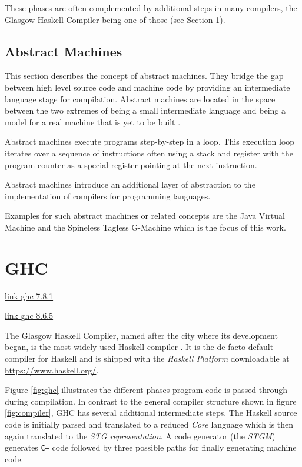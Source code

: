 \documentclass[runningheads]{llncs}
\begin{document}
These phases are often complemented by additional steps in many compilers, the Glasgow Haskell Compiler being one of those (see Section \ref{sec:ghc}).

\subsection{Abstract Machines}
This section describes the concept of abstract machines. They bridge the gap between high level source code and machine code by providing an intermediate language stage for compilation. Abstract machines are located in the space between the two extremes of being a small intermediate language and being a model for a real machine that is yet to be built \cite{diehl2000abstract}.

Abstract machines execute programs step-by-step in a loop. This execution loop iterates over a sequence of instructions often using a stack and register with the program counter as a special register pointing at the next instruction. \cite{diehl2000abstract}

Abstract machines introduce an additional layer of abstraction to the implementation of compilers for programming languages.

Examples for such abstract machines or related concepts are the Java Virtual Machine and the Spineless Tagless G-Machine which is the focus of this work.

\section{GHC}
\label{sec:ghc}

\href{https://downloads.haskell.org/~ghc/7.8.1/docs/html/users_guide/an-external-representation-for-the-ghc-core-language-for-ghc-6.10.html}{link ghc 7.8.1}

\href{https://downloads.haskell.org/ghc/8.6.5/docs/html/users_guide}{link ghc 8.6.5}

The Glasgow Haskell Compiler, named after the city where its development began, is the most widely-used Haskell compiler \cite{marlow2007faster}. It is the de facto default compiler for Haskell and is shipped with the \textit{Haskell Platform} downloadable at \url{https://www.haskell.org/}.

Figure \ref{fig:ghc} illustrates the different phases program code is passed through during compilation. In contrast to the general compiler structure shown in figure \ref{fig:compiler}, GHC has several additional intermediate steps. The Haskell source code is initially parsed and translated to a reduced \textit{Core} language which is then again translated to the \textit{STG representation}. A code generator (the \textit{STGM}) generates \texttt{C--} code followed by three possible paths for finally generating machine code.
\end{document}
